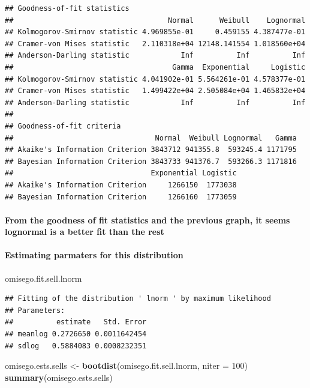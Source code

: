 \documentclass[]{article}
\newenvironment{Shaded}{\begin{snugshade}}{\end{snugshade}}
\newcommand{\KeywordTok}[1]{\textcolor[rgb]{0.13,0.29,0.53}{\textbf{#1}}}
\newcommand{\DataTypeTok}[1]{\textcolor[rgb]{0.13,0.29,0.53}{#1}}
\newcommand{\DecValTok}[1]{\textcolor[rgb]{0.00,0.00,0.81}{#1}}
\newcommand{\StringTok}[1]{\textcolor[rgb]{0.31,0.60,0.02}{#1}}
\newcommand{\NormalTok}[1]{#1}
\let\oldparagraph\paragraph
\renewcommand{\paragraph}[1]{\oldparagraph{#1}\mbox{}}
\begin{document}
\begin{verbatim}
## Goodness-of-fit statistics
##                                    Normal      Weibull    Lognormal
## Kolmogorov-Smirnov statistic 4.969855e-01     0.459155 4.387477e-01
## Cramer-von Mises statistic   2.110318e+04 12148.141554 1.018560e+04
## Anderson-Darling statistic            Inf          Inf          Inf
##                                     Gamma  Exponential     Logistic
## Kolmogorov-Smirnov statistic 4.041902e-01 5.564261e-01 4.578377e-01
## Cramer-von Mises statistic   1.499422e+04 2.505084e+04 1.465832e+04
## Anderson-Darling statistic            Inf          Inf          Inf
## 
## Goodness-of-fit criteria
##                                 Normal  Weibull Lognormal   Gamma
## Akaike's Information Criterion 3843712 941355.8  593245.4 1171795
## Bayesian Information Criterion 3843733 941376.7  593266.3 1171816
##                                Exponential Logistic
## Akaike's Information Criterion     1266150  1773038
## Bayesian Information Criterion     1266160  1773059
\end{verbatim}

\paragraph{From the goodness of fit statistics and the previous graph,
it seems lognormal is a better fit than the
rest}\label{from-the-goodness-of-fit-statistics-and-the-previous-graph-it-seems-lognormal-is-a-better-fit-than-the-rest-2}

\paragraph{Estimating parmaters for this
distribution}\label{estimating-parmaters-for-this-distribution-5}

\begin{Shaded}
\begin{Highlighting}[]
\NormalTok{omisego.fit.sell.lnorm}
\end{Highlighting}
\end{Shaded}

\begin{verbatim}
## Fitting of the distribution ' lnorm ' by maximum likelihood 
## Parameters:
##          estimate   Std. Error
## meanlog 0.2726650 0.0011642454
## sdlog   0.5884083 0.0008232351
\end{verbatim}

\begin{Shaded}
\begin{Highlighting}[]
\NormalTok{omisego.ests.sells <-}\StringTok{ }\KeywordTok{bootdist}\NormalTok{(omisego.fit.sell.lnorm, }\DataTypeTok{niter =} \DecValTok{100}\NormalTok{)}
\KeywordTok{summary}\NormalTok{(omisego.ests.sells)}
\end{Highlighting}
\end{Shaded}
\end{document}
